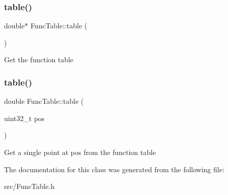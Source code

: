 \subsubsection{\texorpdfstring{table()}{table()}\hspace{0.1cm}{\footnotesize\ttfamily [1/2]}}
{\footnotesize\ttfamily double$\ast$ Func\+Table\+::table (\begin{DoxyParamCaption}{ }\end{DoxyParamCaption})\hspace{0.3cm}{\ttfamily [inline]}}

Get the function table \mbox{\label{class_func_table_a6a7a98c7060fed37cf8a6d8823d7e33b}} 
\subsubsection{\texorpdfstring{table()}{table()}\hspace{0.1cm}{\footnotesize\ttfamily [2/2]}}
{\footnotesize\ttfamily double Func\+Table\+::table (\begin{DoxyParamCaption}\item[{uint32\+\_\+t}]{pos }\end{DoxyParamCaption})\hspace{0.3cm}{\ttfamily [inline]}}

Get a single point at pos from the function table 

The documentation for this class was generated from the following file\+:\begin{DoxyCompactItemize}
\item 
src/Func\+Table.\+h\end{DoxyCompactItemize}
